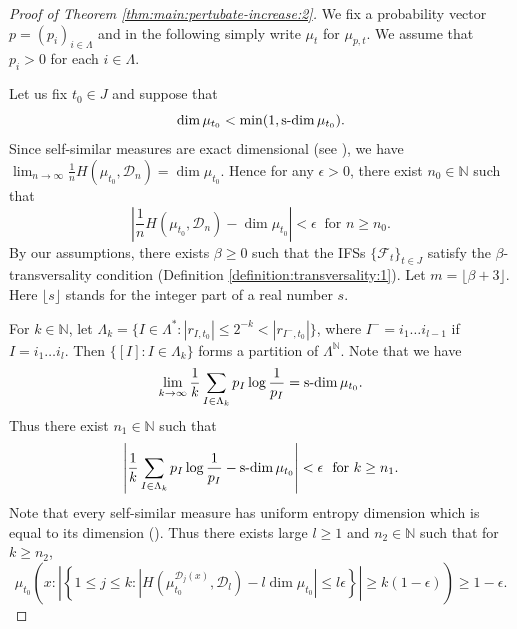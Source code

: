 \documentclass[a4paper,11pt]{amsart}
\theoremstyle{definition}
\numberwithin{equation}{section}
\def\to{\rightarrow}
\def\D{\mathcal{D}}
\def\F{\mathcal F}
\def\N{\mathbb N}
\DeclareMathOperator{\sd}{{\rm{s}\textrm{-}\rm{dim}}}
\begin{document}
\begin{proof}[Proof of Theorem  \ref{thm:main:pertubate-increase:2}]
We fix a probability vector $p=(p_i)_{i\in \Lambda}$ and in the following simply write $\mu_t$ for $\mu_{p,t}$.  We assume that $p_i>0$ for each $i\in \Lambda$.  

Let us fix $t_0\in J$ and suppose that 
\[
\dim \mu_{t_0} <\min (1,  \sd \mu_{t_0}).
\]
Since self-similar measures are  exact dimensional (see \cite{FengHu}),   we have 
$\lim_{n\to \infty} \frac{1}{n}H(\mu_{t_0},\D_n)=\dim \mu_{t_0}.$  Hence  for any $\epsilon>0$,  there exist $n_0\in \N$ such that
\begin{equation}\label{eq:pf:thm-pertubate-increase-2:1}
\left| \frac{1}{n}H(\mu_{t_0},\D_n)-\dim \mu_{t_0} \right| < \epsilon \ \textrm{ for } n\ge n_0. 
\end{equation}
By our assumptions, there exists $\beta\ge 0$ such that the IFSs $\{\F_t\}_{t\in J}$ satisfy the $\beta$-transversality condition (Definition \ref{definition:transversality:1}).    Let $m=\lfloor \beta+3 \rfloor$.  Here $\lfloor s \rfloor$ stands for the integer part of a real number $s$.


For $k\in \N$,   let $\Lambda_k=\{ I\in \Lambda^*: |r_{I,t_0}| \le 2^{-k}<|r_{I^-,t_0}|\}$,   where $I^-=i_1\ldots i_{l-1}$ if $I=i_1\ldots i_{l}$.  
Then $\{[I]: I\in \Lambda_k\}$ forms a partition of $\Lambda^\N$.   
Note that we have \[\lim_{k\to\infty}\frac{1}{k}\sum_{I\in \Lambda_k} p_I\log \frac{1}{p_I}= \sd \mu_{t_0}.\] Thus there exist $n_1\in \N$ such that 
\begin{equation}\label{eq:pf:thm-pertubate-increase-2:2}
\left| \frac{1}{k}\sum_{I\in \Lambda_k} p_I\log \frac{1}{p_I} - \sd \mu_{t_0} \right| < \epsilon \ \textrm{ for } k\ge n_1. 
\end{equation}
Note that every self-similar measure has uniform entropy dimension which is equal to its dimension (\cite[Proposition 5.2]{Hochman2014}).  Thus there exists large $l\ge 1$ and  $n_2\in \N$ such that for $k\ge n_2$,
\begin{equation}\label{eq:pf:thm-pertubate-increase-2:2.1}
\mu_{t_0} \left( x:\left| \left\{ 1\le j\le k: \left|H(\mu_{t_0}^{\D_j(x)},\D_l)-l\dim\mu_{t_0}\right| \le l \epsilon \right\} \right| \ge k(1-\epsilon) \right) \ge 1-\epsilon.
\end{equation}


\end{proof}
\end{document}
